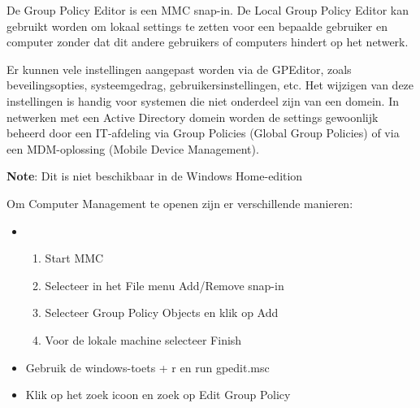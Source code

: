 De Group Policy Editor is een MMC snap-in. De Local Group Policy Editor kan gebruikt worden om lokaal settings te zetten voor een bepaalde gebruiker en computer zonder dat dit andere gebruikers of computers hindert op het netwerk.

Er kunnen vele instellingen aangepast worden via de GPEditor, zoals beveilingsopties, systeemgedrag, gebruikersinstellingen, etc. Het wijzigen van deze instellingen is handig voor systemen die niet onderdeel zijn van een domein. In netwerken met een Active Directory domein worden de settings gewoonlijk beheerd door een IT-afdeling via Group Policies (Global Group Policies) of via een MDM-oplossing (Mobile Device Management).

\textbf{Note}: Dit is niet beschikbaar in de Windows Home-edition


Om Computer Management te openen zijn er verschillende manieren:
\begin{itemize}
\item
	\begin{enumerate}
		\item Start MMC
		\item Selecteer in het File menu Add/Remove snap-in
		\item Selecteer Group Policy Objects en klik op Add
		\item Voor de lokale machine selecteer Finish
	\end{enumerate}
\item Gebruik de windows-toets + r en run gpedit.msc
\item Klik op het zoek icoon en zoek op Edit Group Policy
\end{itemize}

\begin{minipage}[t]{\linewidth}
\raggedright
{}
\end{minipage}

